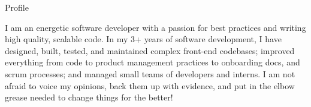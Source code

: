 \documentclass[]{mcdowellcv}
\begin{document}
	\makeheader

	\begin{cvsection}{Profile}
		\vspace{2pt}
		\begin{cvsubsection}{}{}{}
			I am an energetic software developer with a passion for best practices and writing high quality, scalable code.
			In my 3+ years of software development, I have designed, built, tested, and maintained complex front-end codebases;
			improved everything from code to product management practices to onboarding docs, and scrum processes;
			and managed small teams of developers and interns. I am not afraid to voice my opinions, back them up with evidence,
			and put in the elbow grease needed to change things for the better!
		\end{cvsubsection}
	\end{cvsection}
\end{document}
